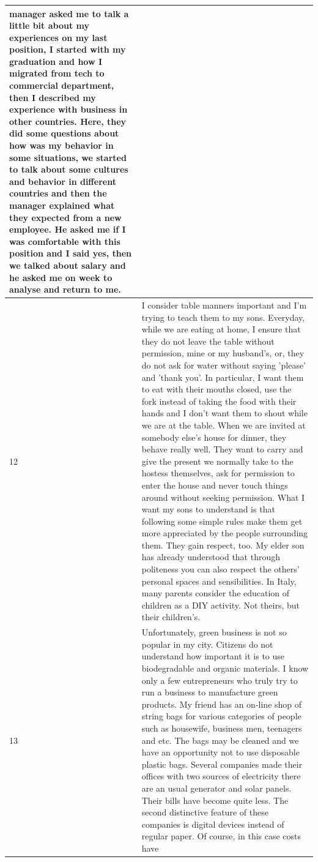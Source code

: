 \documentclass[11pt,a4paper]{article}
\begin{document}
\begin{longtable}{l|p{}}
  manager asked me to talk a little bit about my experiences on my last
  position, I started with my graduation and how I migrated from tech to
  commercial department, then I described my experience with business in other
  countries. Here, they did some questions about how was my behavior in some
  situations, we started to talk about some cultures and behavior in different
  countries and then the manager explained what they expected from a new
  employee. He asked me if I was comfortable with this position and I said yes,
  then we talked about salary and he asked me on week to analyse and return to
  me.\\
  \midrule
  12 & I consider table manners important and I'm trying to teach them to my
  sons. Everyday, while we are eating at home, I ensure that they do not leave
  the table without permission, mine or my husband's, or, they do not ask for
  water without saying 'please' and 'thank you'. In particular, I want them to
  eat with their mouths closed, use the fork instead of taking the food with
  their hands and I don't want them to shout while we are at the table. When we
  are invited at somebody else's house for dinner, they behave really well.
  They want to carry and give the present we normally take to the hostess
  themselves, ask for permission to enter the house and never touch things
  around without seeking permission. What I want my sons to understand is that
  following some simple rules make them get more appreciated by the people
  surrounding them. They gain respect, too. My elder son has already understood
  that through politeness you can also respect the others' personal spaces and
  sensibilities. In Italy, many parents consider the education of children as a
  DIY activity. Not theirs, but their children's.\\
  \midrule
  13 & Unfortunately, green business is not so popular in my city. Citizens do
  not understand how important it is to use biodegradable and organic
  materials. I know only a few entrepreneurs who truly try to run a business to
  manufacture green products. My friend has an on-line shop of string bags for
  various categories of people such as housewife, business men, teenagers and
  etc. The bags may be cleaned and we have an opportunity not to use disposable
  plastic bags. Several companies made their offices with two sources of
  electricity there are an usual generator and solar panels. Their bills have
  become quite less. The second distinctive feature of these companies is
  digital devices instead of regular paper. Of course, in this case costs have

\end{longtable}
\end{document}
